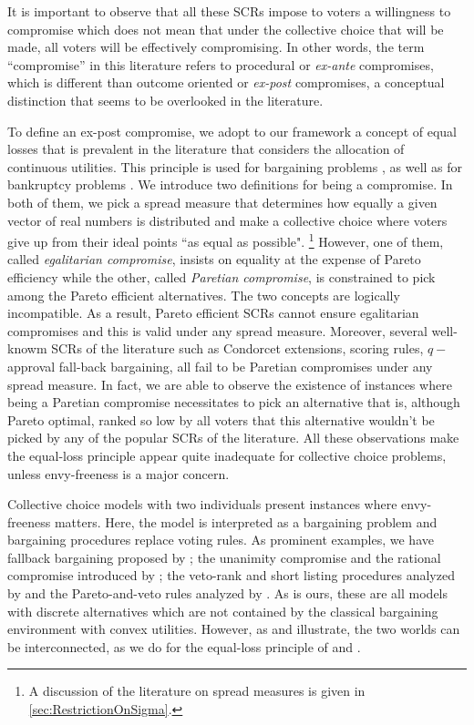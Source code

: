 \documentclass[version=3.21, pagesize, twoside=off, bibliography=totoc, DIV=calc, fontsize=12pt, a4paper]{scrartcl}
\begin{document}
It is important to observe that all these SCRs impose to voters a willingness to compromise which does not mean that under the collective choice that will be made, all voters will be effectively compromising. In other words, the term “compromise” in this literature refers to procedural or \textit{ex-ante} compromises, which is different than outcome oriented or \textit{ex-post} compromises, a conceptual distinction that seems to be overlooked in the literature.

To define an ex-post compromise, we adopt to our framework a concept of equal losses that is prevalent in the literature that considers the allocation of continuous utilities. This principle is used for bargaining problems \citep{Chun1988}, \citep{Chun1991} as well as for bankruptcy problems \citep{Herrero2001}. 
We introduce two definitions for being a compromise. In both of them, we pick a spread measure that determines how equally a given vector of real numbers is distributed and make a collective choice where voters give up from their ideal points “as equal as possible". \footnote{A discussion of the literature on spread measures is given in \cref{sec:RestrictionOnSigma}.} However, one of them, called \textit{egalitarian compromise}, insists on equality at the expense of Pareto efficiency while the other, called \textit{Paretian compromise}, is constrained to pick among the Pareto efficient alternatives. 
The two concepts are logically incompatible. As a result, Pareto efficient SCRs cannot ensure egalitarian compromises and this is valid under any spread measure. Moreover, several well-knowm SCRs of the literature such as Condorcet extensions, scoring rules, $q-$approval fall-back bargaining, all fail to be Paretian compromises under any spread measure. In fact, we are able to observe the existence of instances where being a Paretian compromise necessitates to pick an alternative that is, although Pareto optimal, ranked so low by all voters that this alternative wouldn't be picked by any of the popular SCRs of the literature. All these observations make the equal-loss principle appear quite inadequate for collective choice problems, unless envy-freeness is a major concern.

Collective choice models with two individuals present instances where envy-freeness matters. Here, the model is interpreted as a bargaining problem and bargaining procedures replace voting rules. As prominent examples, we have fallback bargaining proposed by \citet{Brams2001}; the unanimity compromise and the rational compromise introduced by \citet{Kibris2007}; the veto-rank and short listing procedures analyzed by \citet{Clippel2014} and the Pareto-and-veto rules analyzed by \citet{Laslier2020}. As is ours, these are all models with discrete alternatives which are not contained by the classical \citet{Nash1950} bargaining environment with convex utilities. However, as \citet{Mariotti1998} and \citet{Nagahisa2002} illustrate, the two worlds can be interconnected, as we do for the equal-loss principle of \citet{Chun1988} and \citet{Chun1991}.
\end{document}
